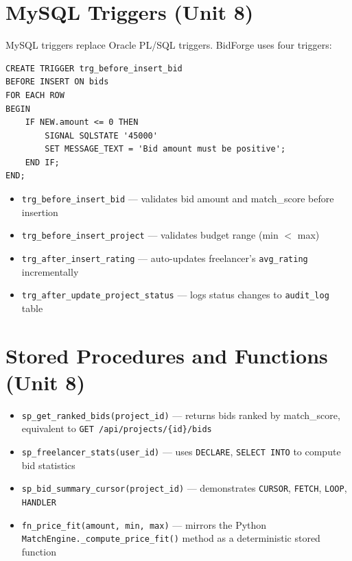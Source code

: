 \documentclass[12pt, a4paper]{report}
\begin{document}
\section{MySQL Triggers (Unit 8)}

MySQL triggers replace Oracle PL/SQL triggers. BidForge uses four triggers:

\begin{lstlisting}[style=pythonstyle, caption={BEFORE INSERT trigger for bid validation (MySQL)}]
CREATE TRIGGER trg_before_insert_bid
BEFORE INSERT ON bids
FOR EACH ROW
BEGIN
    IF NEW.amount <= 0 THEN
        SIGNAL SQLSTATE '45000'
        SET MESSAGE_TEXT = 'Bid amount must be positive';
    END IF;
END;
\end{lstlisting}

\begin{itemize}
  \item \texttt{trg\_before\_insert\_bid} --- validates bid amount and match\_score before insertion
  \item \texttt{trg\_before\_insert\_project} --- validates budget range (min $<$ max)
  \item \texttt{trg\_after\_insert\_rating} --- auto-updates freelancer's \texttt{avg\_rating} incrementally
  \item \texttt{trg\_after\_update\_project\_status} --- logs status changes to \texttt{audit\_log} table
\end{itemize}

\section{Stored Procedures and Functions (Unit 8)}

\begin{itemize}
  \item \texttt{sp\_get\_ranked\_bids(project\_id)} --- returns bids ranked by match\_score, equivalent to \texttt{GET /api/projects/\{id\}/bids}
  \item \texttt{sp\_freelancer\_stats(user\_id)} --- uses \texttt{DECLARE}, \texttt{SELECT INTO} to compute bid statistics
  \item \texttt{sp\_bid\_summary\_cursor(project\_id)} --- demonstrates \texttt{CURSOR}, \texttt{FETCH}, \texttt{LOOP}, \texttt{HANDLER}
  \item \texttt{fn\_price\_fit(amount, min, max)} --- mirrors the Python \texttt{MatchEngine.\_compute\_price\_fit()} method as a deterministic stored function
\end{itemize}
\end{document}

